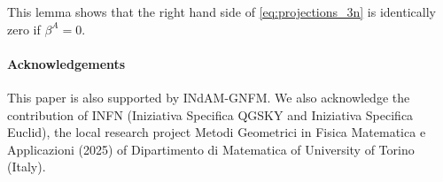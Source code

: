 \documentclass[a4paper, 11pt]{article}
\def\be{\beta}
\numberwithin{equation}{section}
\begin{document}
This lemma shows that the right hand side of \eqref{eq:projections_3n}
is  identically zero if $\be^A = 0$.



\paragraph{Acknowledgements} This paper is also supported by INdAM-GNFM. We also acknowledge the contribution of INFN (Iniziativa Specifica QGSKY
and Iniziativa Specifica Euclid), the local research project Metodi Geometrici
in Fisica Matematica e Applicazioni (2025) of Dipartimento di Matematica of
University of Torino (Italy).

 \nocite{*}
\printbibliography
\end{document}
